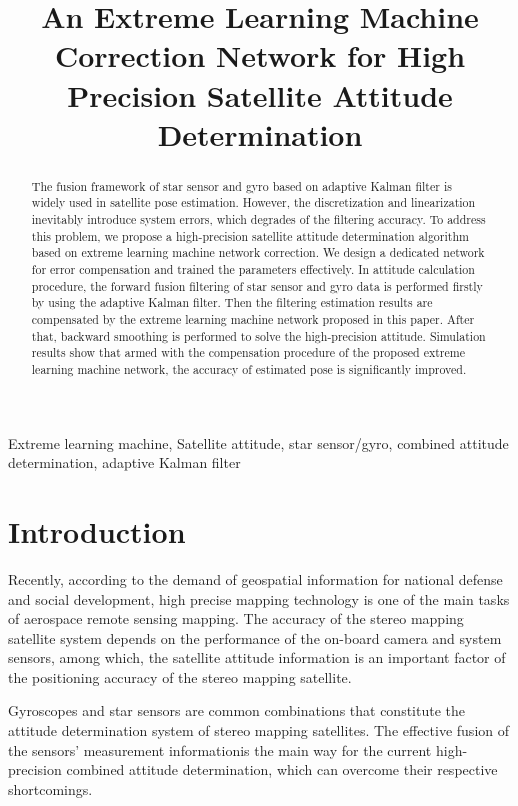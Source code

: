 \documentclass{article}
\title{An Extreme Learning Machine Correction Network for High Precision Satellite Attitude Determination}
\begin{document}
	\maketitle
	\begin{abstract}
	The fusion framework of star sensor and gyro based on adaptive Kalman filter is widely used in satellite pose estimation. However, the discretization and linearization inevitably introduce system errors, which degrades of the filtering accuracy. To address this problem, we propose a high-precision satellite attitude determination algorithm based on extreme learning machine network correction. We design a dedicated network for error compensation and trained the parameters effectively. In attitude calculation procedure, the forward fusion filtering of star sensor and gyro data is performed firstly by using the adaptive Kalman filter. Then the filtering estimation results are compensated by the extreme learning machine network proposed in this paper. After that, backward smoothing is performed to solve the high-precision attitude. Simulation results show that armed with the compensation procedure of the proposed extreme learning machine network, the accuracy of estimated pose is significantly improved.
	\end{abstract}
%
	\begin{keywords}
		Extreme learning machine, Satellite attitude, star sensor/gyro,  combined attitude determination, adaptive Kalman filter
	\end{keywords}
	
	\section{Introduction}
	\label{sec:intro}	
	Recently, according to the demand of geospatial information for national defense and social development, high precise mapping technology is one of the main tasks of aerospace remote sensing mapping. The accuracy of the stereo mapping satellite system depends on the performance of the on-board camera and system sensors, among which, the satellite attitude information is an important factor of the positioning accuracy of the stereo mapping satellite.
	
	Gyroscopes and star sensors are common combinations that constitute the attitude determination system of stereo mapping satellites\cite{hou2019integrated}. 
	The effective fusion of the sensors' measurement informationis the main way for the current high-precision combined attitude determination, which can overcome their respective shortcomings.
	
\end{document}
